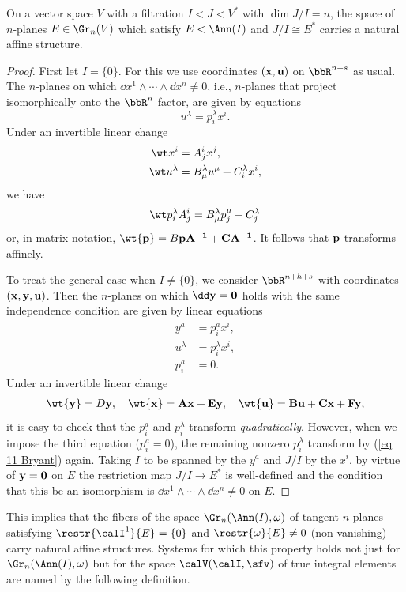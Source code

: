\begin{lem}
    On a vector space $V$ with a filtration $I<J<V^\ast$ with $\dim J\slash I=n$, the space of $n$-planes $E\in\Gr_n(V)$ which satisfy $E<\Ann(I)$ and $J\slash I\cong E^\ast$ carries a natural affine structure.
\end{lem}
\begin{proof}
    First let $I=\{0\}$. For this we use coordinates $(\bf{x},\bf{u})$ on $\bbR^{n+s}$ as usual. The $n$-planes on which $\dd x^1\wedge\cdots\wedge\dd x^n\neq 0$, i.e., $n$-planes that project isomorphically onto the $\bbR^n$ factor, are given by equations 
    \[u^\lambda=p^\lambda_i x^i.\]
    Under an invertible linear change 
    \begin{align}
        \wt x^i&=A^i_jx^j,\\
        \wt u^\lambda&=B^\lambda_\mu u^\mu +C^\lambda_ix^i,
    \end{align}
    we have 
    \[\wt p^\lambda_i A^i_j=B^\lambda_\mu p^\mu_j+C^\lambda_j\label{eq 11 Bryant}\]
    or, in matrix notation, $\wt{\bf{p}}=B\bf{p}A^{-1}+CA^{-1}$. It follows that $\bf{p}$ transforms affinely.

    To treat the general case when $I\neq \{0\}$, we consider $\bbR^{n+h+s}$ with coordinates $(\bf{x},\bf{y},\bf{u})$. Then the $n$-planes on which $\dd \bf{y}=0$ holds with the same independence condition are given by linear equations 
    \begin{align}
        y^a&=p^a_ix^i,\\
        u^\lambda&=p^\lambda_ix^i,\\
        p^a_i&=0.
    \end{align}
    Under an invertible linear change 
    \begin{align}
        \wt{\bf{y}}=D\bf{y},\quad \wt{\bf{x}}=A\bf{x}+E\bf{y},\quad \wt{\bf{u}}=B\bf{u}+C\bf{x}+F\bf{y},
    \end{align}
    it is easy to check that the $p^a_i$ and $p^\lambda_i$ transform \emph{quadratically}. However, when we impose the third equation ($p^a_i=0$), the remaining nonzero $p^\lambda_i$ transform by (\ref{eq 11 Bryant}) again. Taking $I$ to be spanned by the $y^a$ and $J\slash I$ by the $x^i$, by virtue of $\bf{y}=0$ on $E$ the restriction map $J\slash I\to E^\ast$ is well-defined and the condition that this be an isomorphism is $\dd x^1\wedge\cdots\wedge\dd x^n\neq 0$ on $E$.
\end{proof}

This implies that the fibers of the space $\Gr_n(\Ann(I),\omega)$ of tangent $n$-planes satisfying $\restr{\calI^1}{E}=\{0\}$ and $\restr{\omega}{E}\neq 0$ (non-vanishing) carry natural affine structures. Systems for which this property holds not just for $\Gr_n(\Ann(I),\omega)$ but for the space $\calV(\calI,\sfv)$ of true integral elements are named by the following definition.


